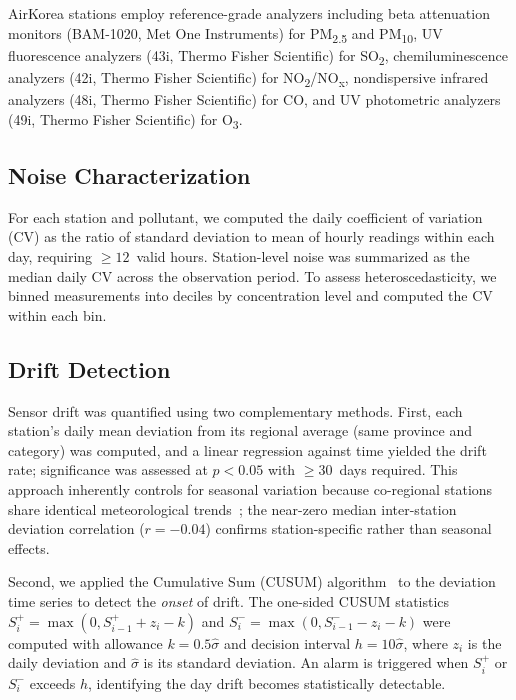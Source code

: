\documentclass[12pt]{article}
\begin{document}
AirKorea stations employ reference-grade analyzers including beta attenuation monitors (BAM-1020, Met One Instruments) for PM\textsubscript{2.5} and PM\textsubscript{10}, UV fluorescence analyzers (43i, Thermo Fisher Scientific) for SO\textsubscript{2}, chemiluminescence analyzers (42i, Thermo Fisher Scientific) for NO\textsubscript{2}/NO\textsubscript{x}, nondispersive infrared analyzers (48i, Thermo Fisher Scientific) for CO, and UV photometric analyzers (49i, Thermo Fisher Scientific) for O\textsubscript{3}.

\subsection{Noise Characterization}

For each station and pollutant, we computed the daily coefficient of variation (CV) as the ratio of standard deviation to mean of hourly readings within each day, requiring ${\geq}12$~valid hours. Station-level noise was summarized as the median daily CV across the observation period. To assess heteroscedasticity, we binned measurements into deciles by concentration level and computed the CV within each bin.

\subsection{Drift Detection}

Sensor drift was quantified using two complementary methods. First, each station's daily mean deviation from its regional average (same province and category) was computed, and a linear regression against time yielded the drift rate; significance was assessed at $p < 0.05$ with ${\geq}30$~days required. This approach inherently controls for seasonal variation because co-regional stations share identical meteorological trends~\cite{epa2017qapp, eu2008aqd}; the near-zero median inter-station deviation correlation ($r = -0.04$) confirms station-specific rather than seasonal effects.

Second, we applied the Cumulative Sum (CUSUM) algorithm~\cite{page1954cusum} to the deviation time series to detect the \emph{onset} of drift. The one-sided CUSUM statistics $S_i^+ = \max(0, S_{i-1}^+ + z_i - k)$ and $S_i^- = \max(0, S_{i-1}^- - z_i - k)$ were computed with allowance $k = 0.5\hat{\sigma}$ and decision interval $h = 10\hat{\sigma}$, where $z_i$ is the daily deviation and $\hat{\sigma}$ is its standard deviation. An alarm is triggered when $S_i^+$ or $S_i^-$ exceeds $h$, identifying the day drift becomes statistically detectable.
\end{document}
